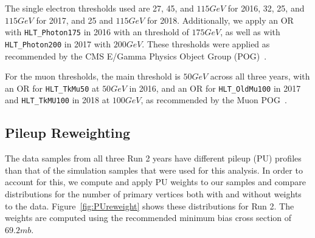 The single electron \pt thresholds used are 27, 45, and $115\unit{GeV}$ for 2016, 32, 25, and $115\unit{GeV}$ for 2017, and 25 and $115\unit{GeV}$ for 2018. %
Additionally, we apply an OR with \texttt{HLT\_Photon175} in 2016 with an \Et threshold of $175\unit{GeV}$, as well as with \texttt{HLT\_Photon200} in 2017 with $200\unit{GeV}$. %
These thresholds were applied as recommended by the CMS E/Gamma Physics Object Group (POG)~\cite{MuonPOG}.

For the muon thresholds, the main threshold is $50\unit{GeV}$ across all three years, with an OR for \texttt{HLT\_TkMu50} at $50\unit{GeV}$ in 2016, and an OR for \texttt{HLT\_OldMu100} in 2017 and \texttt{HLT\_TkMU100} in 2018 at $100\unit{GeV}$, as recommended by the Muon POG~\cite{MuonHLT2016,MuonHLT2017,MuonHLT2018}.


\subsection{Pileup Reweighting}

The data samples from all three Run 2 years have different pileup (PU) profiles than that of the simulation samples that were used for this analysis.
In order to account for this, we compute and apply PU weights to our samples and compare distributions for the number of primary vertices both with and without weights to the data.
Figure~\ref{fig:PUreweight} shows these distributions for Run 2.
The weights are computed using the recommended minimum bias cross section of $69.2\unit{mb}$. %

